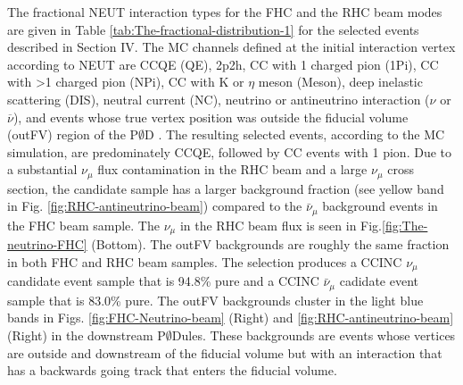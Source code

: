 The fractional NEUT interaction types for the FHC and the
RHC beam modes are given in Table \ref{tab:The-fractional-distribution-1}
for the selected events described in Section IV. The MC channels defined\citep{joe-sam}
at the
initial interaction vertex according to NEUT are 
CCQE (QE), 2p2h, CC with 1 charged pion (1Pi), CC with
>1 charged pion (NPi), CC with K or $\eta$ meson (Meson), deep inelastic
scattering (DIS), neutral current (NC),
neutrino or antineutrino interaction
($\nu$ or $\overline{\nu}$), and events whose true vertex position was
outside the fiducial volume (outFV) region of the P$\emptyset$D . The 
resulting selected events, according to the MC simulation, 
are predominately CCQE, followed by CC events with 1 pion. 
Due to a substantial
$\nu_\mu$ flux contamination in the RHC beam and a large $\nu_\mu$ cross section,
the \nubar candidate sample has a larger background fraction (see yellow band
in Fig. \ref{fig:RHC-antineutrino-beam})
compared to the $\bar{\nu}_\mu$ background events in the FHC
beam sample. 
The $\nu_\mu$ in the
RHC beam flux is seen in Fig.\ref{fig:The-neutrino-FHC} (Bottom). 
The outFV backgrounds are roughly the same
fraction in both FHC and RHC beam samples. The selection 
produces a CCINC $\nu_\mu$ candidate event sample that is 94.8\% pure 
and a CCINC $\bar\nu_\mu$ cadidate event sample that is 83.0\% pure. 
The outFV backgrounds cluster in
the light blue bands in Figs. 
\ref{fig:FHC-Neutrino-beam} (Right) 
and
\ref{fig:RHC-antineutrino-beam} (Right) 
in the downstream P$\emptyset$Dules. These backgrounds are events whose 
vertices are outside and downstream of the fiducial volume but with 
an interaction that has a backwards going
track that enters the fiducial volume.

